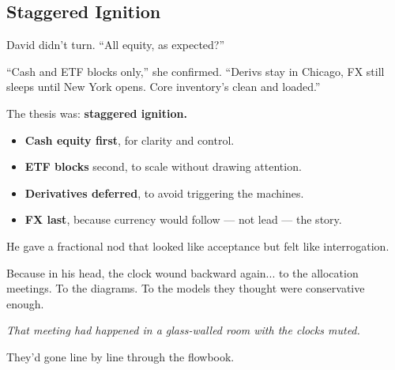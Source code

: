 
\subsection{Staggered Ignition}

David didn’t turn. “All equity, as expected?”

“Cash and ETF blocks only,” she confirmed. “Derivs stay in Chicago, FX still sleeps until New York opens. 
Core inventory’s clean and loaded.”

The thesis was: \textbf{staggered ignition.}

\begin{itemize}
\item \textbf{Cash equity first}, for clarity and control.
\item \textbf{ETF blocks} second, to scale without drawing attention.
\item \textbf{Derivatives deferred}, to avoid triggering the machines.
\item \textbf{FX last}, because currency would follow — not lead — the story.
\end{itemize}

He gave a fractional nod that looked like acceptance but felt like interrogation.

Because in his head, the clock wound backward again... to the allocation meetings.
To the diagrams.
To the models they thought were conservative enough.

\textit{That meeting had happened in a glass-walled room with the clocks muted.}

They’d gone line by line through the flowbook.

\medskip

